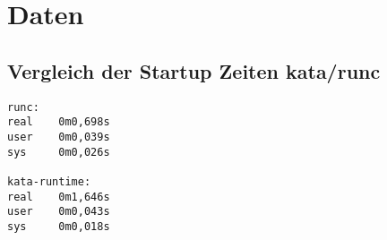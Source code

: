 \chapter{Daten}

\section{Vergleich der Startup Zeiten kata/runc}
\hfill \newline
\label{app:startuptimecomparison}
\begin{lstlisting}
runc:
real	0m0,698s
user	0m0,039s
sys	    0m0,026s

kata-runtime:
real	0m1,646s
user	0m0,043s
sys	    0m0,018s    
\end{lstlisting}